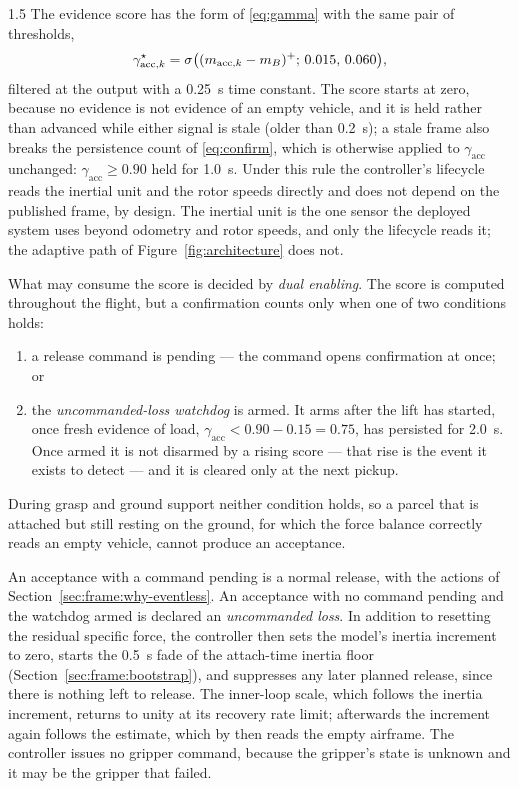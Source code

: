 \begin{spacing}{1.5}
The evidence score has the form of \eqref{eq:gamma} with the same pair of
thresholds,
\begin{equation}
\gamma^\star_{\mathrm{acc},k}=\sigma\bigl((m_{\mathrm{acc},k}-m_B)^{+};\,0.015,\,0.060\bigr),
\label{eq:gammaacc}
\end{equation}
filtered at the output with a \SI{0.25}{\second} time constant. The score
starts at zero, because no evidence is not evidence of an empty vehicle, and it
is held rather than advanced while either signal is stale (older than
\SI{0.2}{\second}); a stale frame also breaks the persistence count of
\eqref{eq:confirm}, which is otherwise applied to $\gamma_{\mathrm{acc}}$
unchanged: $\gamma_{\mathrm{acc}}\ge0.90$ held for \SI{1.0}{\second}. Under this
rule the controller's lifecycle reads the inertial unit and the rotor speeds
directly and does not depend on the published frame, by design. The inertial
unit is the one sensor the deployed system uses beyond odometry and rotor
speeds, and only the lifecycle reads it; the adaptive path of
Figure~\ref{fig:architecture} does not.

What may consume the score is decided by \emph{dual enabling}. The score is
computed throughout the flight, but a confirmation counts only when one of two
conditions holds:
\begin{enumerate}
\item a release command is pending --- the command opens confirmation at once; or
\item the \emph{uncommanded-loss watchdog} is armed. It arms after the lift has
started, once fresh evidence of load, $\gamma_{\mathrm{acc}}<0.90-0.15=0.75$,
has persisted for \SI{2.0}{\second}. Once armed it is not disarmed by a rising
score --- that rise is the event it exists to detect --- and it is cleared only
at the next pickup.
\end{enumerate}
During grasp and ground support neither condition holds, so a parcel that is
attached but still resting on the ground, for which the force balance correctly
reads an empty vehicle, cannot produce an acceptance.

An acceptance with a command pending is a normal release, with the actions of
Section~\ref{sec:frame:why-eventless}. An acceptance with no command pending and
the watchdog armed is declared an \emph{uncommanded loss}. In addition to
resetting the residual specific force, the controller then sets the model's
inertia increment to zero, starts the \SI{0.5}{\second} fade of the attach-time
inertia floor (Section~\ref{sec:frame:bootstrap}), and suppresses any later
planned release, since there is nothing left to release. The inner-loop scale,
which follows the inertia increment, returns to unity at its recovery rate limit;
afterwards the increment again follows the estimate, which by then reads the
empty airframe. The controller issues no gripper command, because the gripper's
state is unknown and it may be the gripper that failed.


\end{spacing}
